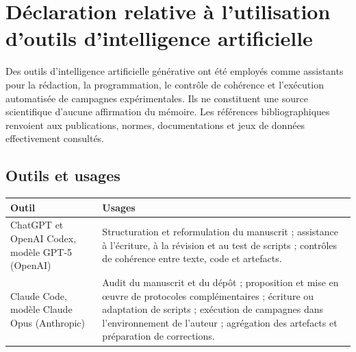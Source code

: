 
\chapter*{Déclaration relative à l'utilisation d'outils d'intelligence artificielle}

Des outils d'intelligence artificielle générative ont été employés comme assistants pour
la rédaction, la programmation, le contrôle de cohérence et l'exécution automatisée de
campagnes expérimentales. Ils ne constituent une source scientifique d'aucune affirmation
du mémoire. Les références bibliographiques renvoient aux publications, normes,
documentations et jeux de données effectivement consultés.

\section*{Outils et usages}

\begin{table}[H]
\centering
\small
\begin{tabularx}{\textwidth}{p{}X}
\toprule
\textbf{Outil} & \textbf{Usages} \\
\midrule
ChatGPT et OpenAI Codex, modèle GPT-5 (OpenAI) &
Structuration et reformulation du manuscrit ; assistance à l'écriture, à la révision et
au test de scripts ; contrôles de cohérence entre texte, code et artefacts. \\
Claude Code, modèle Claude Opus (Anthropic) &
Audit du manuscrit et du dépôt ; proposition et mise en œuvre de protocoles
complémentaires ; écriture ou adaptation de scripts ; exécution de campagnes dans
l'environnement de l'auteur ; agrégation des artefacts et préparation de corrections. \\
\bottomrule
\end{tabularx}
\end{table}

